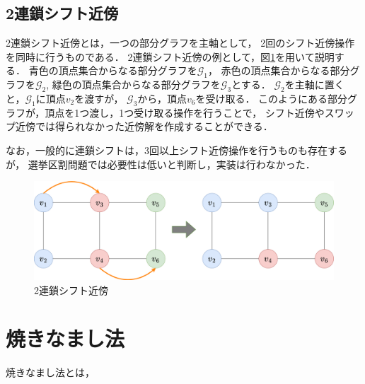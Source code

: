 \subsection{2連鎖シフト近傍}

2連鎖シフト近傍とは，一つの部分グラフを主軸として，
2回のシフト近傍操作を同時に行うものである．
2連鎖シフト近傍の例として，図\ref{chain-neighbor}を用いて説明する．
青色の頂点集合からなる部分グラフを$\mathcal{G}_1$，
赤色の頂点集合からなる部分グラフを$\mathcal{G}_2$,
緑色の頂点集合からなる部分グラフを$\mathcal{G}_3$とする．
$\mathcal{G}_2$を主軸に置くと，$\mathcal{G}_1$に頂点$v_2$を渡すが，
$\mathcal{G}_3$から，頂点$v_6$を受け取る．
このようにある部分グラフが，頂点を1つ渡し，1つ受け取る操作を行うことで，
シフト近傍やスワップ近傍では得られなかった近傍解を作成することができる．

なお，一般的に連鎖シフトは，3回以上シフト近傍操作を行うものも存在するが，
選挙区割問題では必要性は低いと判断し，実装は行わなかった．

\begin{figure}[htbp]
  \centering
  \includegraphics[scale=0.2]{img/chain-neighbor.png}
  \caption{2連鎖シフト近傍}
  \label{chain-neighbor}
\end{figure}

\section{焼きなまし法}

焼きなまし法とは，